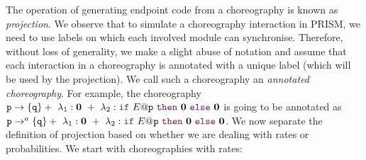   The operation of generating
endpoint code from a choreography is known as {\em
  projection}. 
We observe that to simulate a choreography interaction in
PRISM, we need to use labels on which each involved module can
synchronise. Therefore, without loss of generality, we make a slight
abuse of notation and assume that each interaction in a choreography
is annotated with a unique label (which will be used by the
projection). We call such a choreography an {\em annotated
  choreography}. 
%
% 
For example, the choreography
$\interactBase{p}{q} +\ \lambda_1: \CEnd \ +\ \lambda_2: \ifTE
  {E}{p}{\CEnd}{\CEnd}$ is going to be annotated as
  $\interactBasel{p}{a}{q} +\ \lambda_1: \CEnd \ +\ \lambda_2: \ifTEl
    {E}{}{p}{\CEnd}{\CEnd}$.
We now separate the definition of projection based on whether we
are dealing with rates or probabilities.  We start with choreographies 
with rates: 
% 
